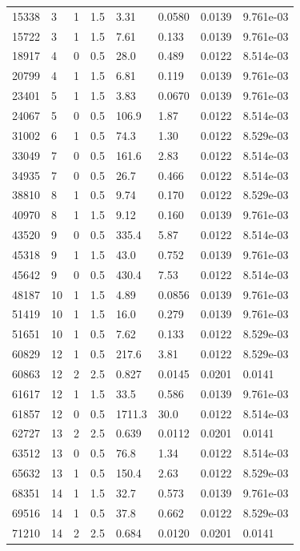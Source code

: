 \documentclass[preview]{standalone}
\begin{document}
{{\begin{tabular}{L{1.2cm}C{1.2cm} C{0.3cm}C{0.5cm} C{1.4cm}C{1.4cm} C{1.4cm}C{1.4cm}}
  15338  &     3  & 1     & 1.5 &  3.31  & 0.0580  & 0.0139 &  9.761e-03   \\ 
  15722  &     3  & 1     & 1.5 &  7.61  & 0.133  & 0.0139 &  9.761e-03   \\ 
  18917  &     4  & 0     & 0.5 &  28.0  & 0.489  & 0.0122 &  8.514e-03   \\ 
  20799  &     4  & 1     & 1.5 &  6.81  & 0.119  & 0.0139 &  9.761e-03   \\ 
  23401  &     5  & 1     & 1.5 &  3.83  & 0.0670  & 0.0139 &  9.761e-03   \\ 
  24067  &     5  & 0     & 0.5 &  106.9  & 1.87  & 0.0122 &  8.514e-03   \\ 
  31002  &     6  & 1     & 0.5 &  74.3  & 1.30  & 0.0122 &  8.529e-03   \\ 
  33049  &     7  & 0     & 0.5 &  161.6  & 2.83  & 0.0122 &  8.514e-03   \\ 
  34935  &     7  & 0     & 0.5 &  26.7  & 0.466  & 0.0122 &  8.514e-03   \\ 
  38810  &     8  & 1     & 0.5 &  9.74  & 0.170  & 0.0122 &  8.529e-03   \\ 
  40970  &     8  & 1     & 1.5 &  9.12  & 0.160  & 0.0139 &  9.761e-03   \\ 
  43520  &     9  & 0     & 0.5 &  335.4  & 5.87  & 0.0122 &  8.514e-03   \\ 
  45318  &     9  & 1     & 1.5 &  43.0  & 0.752  & 0.0139 &  9.761e-03   \\ 
  45642  &     9  & 0     & 0.5 &  430.4  & 7.53  & 0.0122 &  8.514e-03   \\ 
  48187  &    10  & 1     & 1.5 &  4.89  & 0.0856  & 0.0139 &  9.761e-03   \\ 
  51419  &    10  & 1     & 1.5 &  16.0  & 0.279  & 0.0139 &  9.761e-03   \\ 
  51651  &    10  & 1     & 0.5 &  7.62  & 0.133  & 0.0122 &  8.529e-03   \\ 
  60829  &    12  & 1     & 0.5 &  217.6  & 3.81  & 0.0122 &  8.529e-03   \\ 
  60863  &    12  & 2     & 2.5 &  0.827  & 0.0145  & 0.0201 &  0.0141   \\ 
  61617  &    12  & 1     & 1.5 &  33.5  & 0.586  & 0.0139 &  9.761e-03   \\ 
  61857  &    12  & 0     & 0.5 &  1711.3  & 30.0  & 0.0122 &  8.514e-03   \\ 
  62727  &    13  & 2     & 2.5 &  0.639  & 0.0112  & 0.0201 &  0.0141   \\ 
  63512  &    13  & 0     & 0.5 &  76.8  & 1.34  & 0.0122 &  8.514e-03   \\ 
  65632  &    13  & 1     & 0.5 &  150.4  & 2.63  & 0.0122 &  8.529e-03   \\ 
  68351  &    14  & 1     & 1.5 &  32.7  & 0.573  & 0.0139 &  9.761e-03   \\ 
  69516  &    14  & 1     & 0.5 &  37.8  & 0.662  & 0.0122 &  8.529e-03   \\ 
  71210  &    14  & 2     & 2.5 &  0.684  & 0.0120  & 0.0201 &  0.0141   \\ 
\hline 
\end{tabular} 

}}
\end{document}
